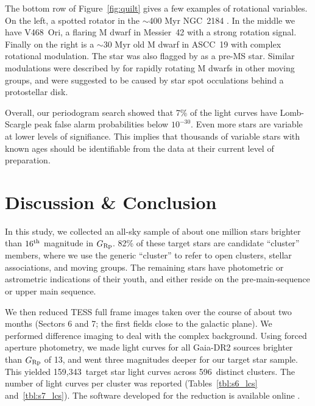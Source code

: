 \documentclass[12pt,twocolumn,tighten,trackchanges]{aastex62}
\newcommand{\numberlcs}{159{,}343\ } %
\newcommand{\numberclusters}{596\ } %
\begin{document}
The bottom row of Figure~\ref{fig:quilt} gives a few examples of
rotational variables.  On the left, a spotted rotator in the
$\sim$400 Myr NGC~2184 \citep{cantat-gaudin_gaia_2018}.  In the
middle we have V468~Ori, a flaring M dwarf in Messier~42 with a strong
rotation signal.
Finally on the right is a $\sim$30 Myr old M dwarf in ASCC~19
with complex rotational modulation.
The star was also flagged by \citet{zari_3d_2018} as a pre-MS star.
Similar modulations were described by \citet{zhan_complex_2019} for
rapidly rotating M dwarfs in other moving groups, and were suggested
to be caused by star spot occulations behind a protostellar disk.

Overall, our periodogram search showed that 7\% of the light curves
have Lomb-Scargle peak false alarm probabilities below $10^{-30}$.
Even more stars are variable at lower levels of signifiance.  This implies
that thousands of variable stars with known ages should
be identifiable from the data at their current level of preparation.




\section{Discussion \& Conclusion}
\label{sec:conclusion}

In this study, we collected an all-sky sample of about one million
stars brighter than $16^{\rm th}$ magnitude in $G_{\rm Rp}$.  82\% of
these target stars are candidate ``cluster'' members, where we use the
generic ``cluster'' to refer to open clusters, stellar associations,
and moving groups.  The remaining stars have photometric or
astrometric indications of their youth, and either reside on the
pre-main-sequence or upper main sequence.

We then reduced TESS full frame images taken over the course of about
two months (Sectors 6 and 7; the first fields close to the galactic
plane).  We performed difference imaging to deal with the complex
background.  Using forced aperture photometry, we made light curves
for all Gaia-DR2 sources brighter than $G_{\rm Rp}$ of 13, and went
three magnitudes deeper for our target star sample.  This yielded
\numberlcs target star light curves across \numberclusters distinct
clusters.  The number of light curves per cluster was reported
(Tables~\ref{tbl:s6_lcs} and~\ref{tbl:s7_lcs}).  The software
developed for the reduction is available online
\citep{bhatti_cdips-pipeline_2019}.
\end{document}
